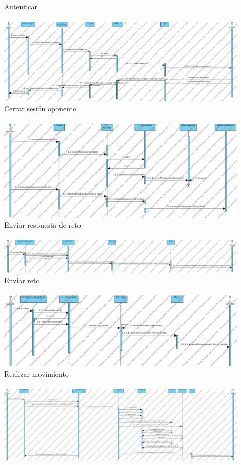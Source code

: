 \documentclass[a4paper,11pt,oneside]{article}
\begin{document}
Autenticar
\\ \\
\includegraphics[width=0.9\textwidth]{img/ds_autenticar.png}\\[1cm]

Cerrar sesión oponente
\\ \\
\includegraphics[width=0.9\textwidth]{img/ds_CerrarSesionOponenteCliente.png}\\[1cm]

Enviar respuesta de reto
\\ \\
\includegraphics[width=0.9\textwidth]{img/ds_EnviarRespuestaRetoCliente.png}\\[1cm]

Enviar reto
\\ \\
\includegraphics[width=0.9\textwidth]{img/ds_EnviarRetoCliente.png}\\[1cm]

Realizar movimiento
\\ \\
\includegraphics[width=0.9\textwidth]{img/ds_RealizarMovimientoCliente.png}\\[1cm]
\end{document}
